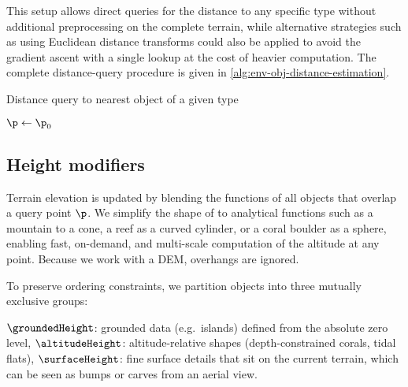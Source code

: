 This setup allows direct queries for the distance to any specific type without additional preprocessing on the complete terrain, while alternative strategies such as using Euclidean distance transforms could also be applied to avoid the gradient ascent with a single lookup at the cost of heavier computation. The complete distance-query procedure is given in \cref{alg:env-obj-distance-estimation}.

\begin{algorithm}%
    \DontPrintSemicolon
    \caption{Distance query to nearest object of a given type}
    \label{alg:env-obj-distance-estimation}
    \BlankLine
    $\p \gets \p_0$\;
\end{algorithm}







\subsection{Height modifiers}
\label{sec:env-obj-height-modifiers}

Terrain elevation is updated by blending the  functions of all objects that overlap a query point $\p$. We simplify the shape of  to analytical functions such as a mountain to a cone, a reef as a curved cylinder, or a coral boulder as a sphere, enabling fast, on-demand, and multi-scale computation of the altitude at any point. Because we work with a DEM, overhangs are ignored.

To preserve ordering constraints, we partition objects into three mutually exclusive groups:
\begin{Itemize}
    \Item{} $\groundedHeight$: grounded data (e.g.\ islands) defined from the absolute zero level,
    \Item{} $\altitudeHeight$: altitude-relative shapes (depth-constrained corals, tidal flats),
    \Item{} $\surfaceHeight$: fine surface details that sit on the current terrain, which can be seen as bumps or carves from an aerial view.
\end{Itemize}

